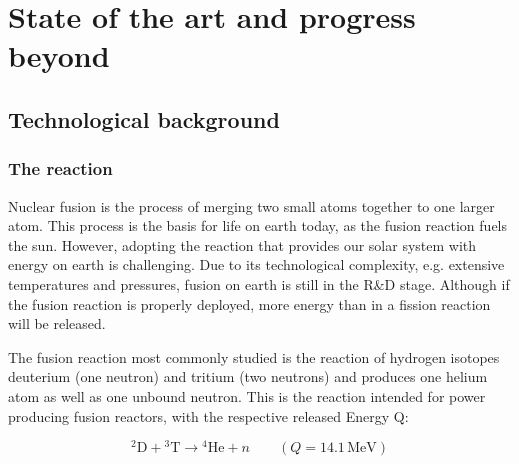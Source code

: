 \chapter{State of the art and progress beyond} 
\label{chap_state_of_the_art}

\section{Technological background} 
\label{sec_technological_background}
    \subsection{The reaction} 
    \label{subsec_the_reaction}
    Nuclear fusion is the process of merging two small atoms together to one larger atom.
    This process is the basis for life on earth today, as the fusion reaction fuels the sun. However, adopting the reaction that provides our solar system with energy on earth is challenging. Due to its technological complexity, e.g. extensive temperatures and pressures, fusion on earth is still in the R\&D stage. Although if the fusion reaction is properly deployed, more energy than in a fission reaction will be released. \cite{wimmersNuclearPowerTechnology2026}

    The fusion reaction most commonly studied is the reaction of hydrogen isotopes deuterium (one neutron) and tritium (two neutrons) and produces one helium atom as well as one unbound neutron. \cite{wimmersNuclearPowerTechnology2026}
    This is the reaction intended for power producing fusion reactors, with the respective released Energy Q: \cite{AcostaFlexer2018}

    \begin{equation}
    {}^{2}\mathrm{D} + {}^{3}\mathrm{T} \rightarrow {}^{4}\mathrm{He} + n
    \qquad (Q = 14.1\,\mathrm{MeV})
    \label{equ_basicfusion3}
    \end{equation}

